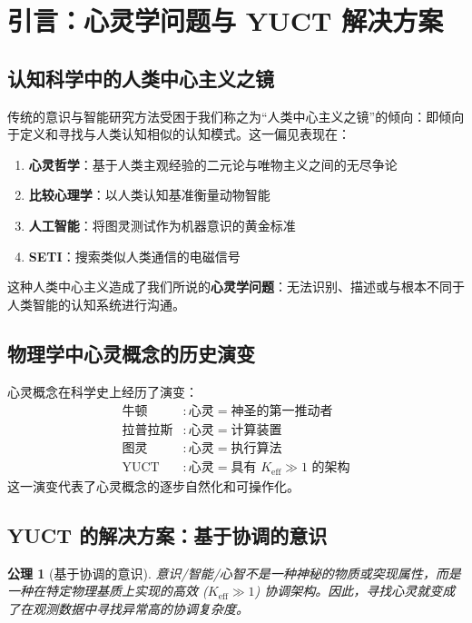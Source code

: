 \documentclass[11pt,a4paper]{article}
\newtheorem{axiom}{公理}
\newcommand{\eff}{\mathrm{eff}}
\newcommand{\Ke}{K_{\eff}}
\begin{document}
	\tableofcontents
	
	\newpage
	
	\section{引言：心灵学问题与 YUCT 解决方案}
	
	\subsection{认知科学中的人类中心主义之镜}
	
	传统的意识与智能研究方法受困于我们称之为“人类中心主义之镜”的倾向：即倾向于定义和寻找与人类认知相似的认知模式。这一偏见表现在：
	\begin{enumerate}
		\item \textbf{心灵哲学}：基于人类主观经验的二元论与唯物主义之间的无尽争论
		\item \textbf{比较心理学}：以人类认知基准衡量动物智能
		\item \textbf{人工智能}：将图灵测试作为机器意识的黄金标准
		\item \textbf{SETI}：搜索类似人类通信的电磁信号
	\end{enumerate}
	这种人类中心主义造成了我们所说的\textbf{心灵学问题}：无法识别、描述或与根本不同于人类智能的认知系统进行沟通。
	
	\subsection{物理学中心灵概念的历史演变}
	
	心灵概念在科学史上经历了演变：
	\[
	\begin{aligned}
		\text{牛顿} &: \text{心灵} = \text{神圣的第一推动者} \\
		\text{拉普拉斯} &: \text{心灵} = \text{计算装置} \\
		\text{图灵} &: \text{心灵} = \text{执行算法} \\
		\text{YUCT} &: \text{心灵} = \text{具有 } \Ke \gg 1 \text{ 的架构}
	\end{aligned}
	\]
	这一演变代表了心灵概念的逐步自然化和可操作化。
	
	\subsection{YUCT 的解决方案：基于协调的意识}
	
	\begin{axiom}[基于协调的意识]
		意识/智能/心智不是一种神秘的物质或突现属性，而是一种在特定物理基质上实现的高效 (\(\Ke \gg 1\)) 协调架构。因此，寻找心灵就变成了在观测数据中寻找异常高的协调复杂度。
	\end{axiom}
	
\end{document}
